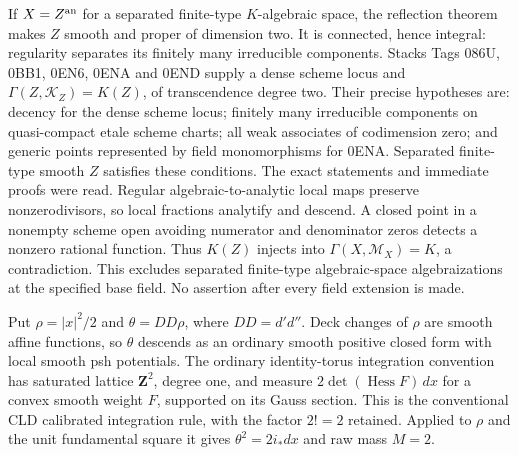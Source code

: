 \documentclass[11pt]{article}
\begin{document}
If $X=Z^{\rm an}$ for a separated finite-type $K$-algebraic space, the reflection theorem makes $Z$ smooth and proper of dimension two. It is connected, hence integral: regularity separates its finitely many irreducible components. Stacks Tags 086U, 0BB1, 0EN6, 0ENA and 0END supply a dense scheme locus and $\Gamma(Z,\mathcal K_Z)=K(Z)$, of transcendence degree two. Their precise hypotheses are: decency for the dense scheme locus; finitely many irreducible components on quasi-compact etale scheme charts; all weak associates of codimension zero; and generic points represented by field monomorphisms for 0ENA. Separated finite-type smooth $Z$ satisfies these conditions. The exact statements and immediate proofs were read. Regular algebraic-to-analytic local maps preserve nonzerodivisors, so local fractions analytify and descend. A closed point in a nonempty scheme open avoiding numerator and denominator zeros detects a nonzero rational function. Thus $K(Z)$ injects into $\Gamma(X,\mathcal M_X)=K$, a contradiction. This excludes separated finite-type algebraic-space algebraizations at the specified base field. No assertion after every field extension is made.

Put $\rho=|x|^2/2$ and $\theta=DD\rho$, where $DD=d'd''$. Deck changes of $\rho$ are smooth affine functions, so $\theta$ descends as an ordinary smooth positive closed form with local smooth psh potentials. The ordinary identity-torus integration convention has saturated lattice $\mathbf Z^2$, degree one, and measure $2\det(\operatorname{Hess}F)\,dx$ for a convex smooth weight $F$, supported on its Gauss section. This is the conventional CLD calibrated integration rule, with the factor $2!=2$ retained. Applied to $\rho$ and the unit fundamental square it gives $\theta^2=2i_*dx$ and raw mass $M=2$.
\end{document}
